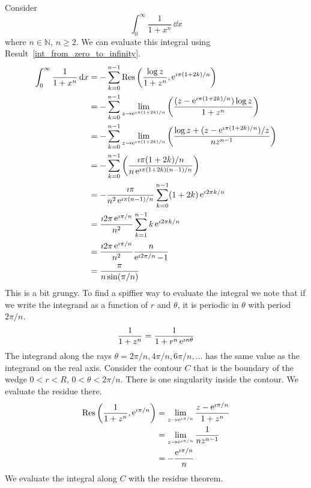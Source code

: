 \begin{Example}
  Consider 
  \[
  \int_0^\infty \frac{1}{1+x^n} \,\dd x
  \]
  where $n \in \mathbb{N}$, $n \geq 2$.  We can evaluate this integral using
  Result~\ref{int_from_zero_to_infinity}.
  \begin{align*}
    \int_0^\infty \frac{1}{1+x^n} \,\mathrm{d} x
    &= - \sum_{k = 0}^{n-1} \mathop{\mathrm{Res}}\nolimits\left(\frac{\log z}{1+z^n}, 
      \mathop{\mathrm{e}}\nolimits^{\imath \pi(1 + 2k)/n} \right) \\
    &= - \sum_{k = 0}^{n-1} \lim_{z \to \mathop{\mathrm{e}}\nolimits^{\imath \pi (1+2k)/n}} 
    \left(\frac{(z - \mathop{\mathrm{e}}\nolimits^{\imath \pi (1+2k)/n}) \log z}{1+z^n} \right) \\
    &= - \sum_{k = 0}^{n-1} \lim_{z \to \mathop{\mathrm{e}}\nolimits^{\imath \pi (1+2k)/n}} 
    \left(\frac{\log z + (z - \mathop{\mathrm{e}}\nolimits^{\imath \pi (1+2k)/n})/z}{n z^{n-1}} 
    \right) \\
    &= - \sum_{k = 0}^{n-1} 
    \left(\frac{ \imath \pi (1 + 2k)/n }{ n \mathop{\mathrm{e}}\nolimits^{\imath \pi (1+2k)(n-1)/n } }
    \right) \\
    &= - \frac{ \imath \pi }{ n^2 \mathop{\mathrm{e}}\nolimits^{\imath \pi (n-1)/n } } \sum_{k = 0}^{n-1} 
    (1 + 2k) \mathop{\mathrm{e}}\nolimits^{\imath 2 \pi k/n } \\
    &= \frac{ \imath 2 \pi \mathop{\mathrm{e}}\nolimits^{\imath \pi / n} }{ n^2 } \sum_{k = 1}^{n-1} 
    k \mathop{\mathrm{e}}\nolimits^{\imath 2 \pi k/n } \\
    &= \frac{ \imath 2 \pi \mathop{\mathrm{e}}\nolimits^{\imath \pi / n} }{ n^2 } 
    \frac{ n }{ \mathop{\mathrm{e}}\nolimits^{\imath 2 \pi / n} - 1 } \\
    &= \frac{ \pi }{ n \sin( \pi / n ) }
  \end{align*}
  This is a bit grungy.  To find a spiffier way to evaluate the integral we 
  note that if we write the integrand as a function of $r$ and $\theta$,
  it is periodic in $\theta$ with period $2 \pi / n$.  
  \[
  \frac{1}{1+z^n} = \frac{1}{1 + r^n \mathop{\mathrm{e}}\nolimits^{\imath n \theta}}
  \]
  The integrand along 
  the rays $\theta = 2 \pi /n, 4 \pi/n, 6 \pi/n, \ldots$ has the same value
  as the integrand on the real axis.   Consider the contour $C$ that is the 
  boundary of the wedge $0 < r < R$, $0 < \theta < 2 \pi / n$.
  There is one singularity inside the contour.  We evaluate the residue there.
  \begin{align*}
    \mathop{\mathrm{Res}}\nolimits \left( \frac{1}{1+z^n}, \mathop{\mathrm{e}}\nolimits^{\imath \pi / n} \right)
    &= \lim_{z \to \mathop{\mathrm{e}}\nolimits^{\imath \pi / n} } \frac{ z - \mathop{\mathrm{e}}\nolimits^{\imath \pi/n} }{1+z^n} \\
    &= \lim_{z \to \mathop{\mathrm{e}}\nolimits^{\imath \pi / n} } \frac{ 1 }{n z^{n-1}} \\
    &= - \frac{ \mathop{\mathrm{e}}\nolimits^{\imath \pi / n} }{ n }
  \end{align*}
  We evaluate the integral along $C$ with the residue theorem.

\end{Example}
